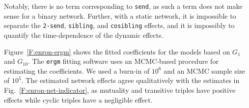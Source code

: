 \documentclass[final]{statsoc}
\begin{document}
\noindent
Notably, there is no term corresponding to \texttt{send}, as such a term does
not make sense for a binary network.  Further, with a static network, it is
impossible to separate the \texttt{2-send}, \texttt{sibling}, and
\texttt{cosibling} effects, and it is impossibly to quantify the
time-dependence of the dynamic effects.

Figure~\ref{F:enron-ergm} shows the fitted coefficients for the models based on
$G_1$ and $G_{10}$.  The \texttt{ergm} fitting software uses an MCMC-based
procedure for estimating the coefficients.  We used a burn-in of $10^6$ and
an MCMC sample size of $10^5$.  The estimated network effects agree
qualitatively with the estimates in Fig.~\ref{F:enron-net-indicator}, as
mutuality and transitive triples have positive effects while cyclic triples
have a negligible effect.
\end{document}
